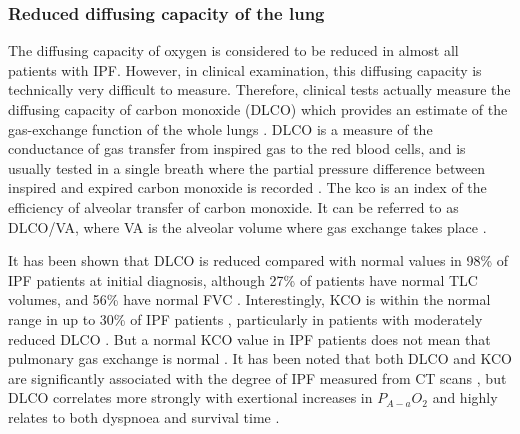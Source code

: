 \subsubsection{Reduced diffusing capacity of the lung}
The diffusing capacity of oxygen is considered to be reduced in almost all patients with IPF. However, in clinical examination, this diffusing capacity is technically very difficult to measure. Therefore, clinical tests actually measure the diffusing capacity of carbon monoxide (DLCO) which provides an estimate of the gas-exchange function of the whole lungs \citep{plantier2018physiology}. DLCO is a measure of the conductance of gas transfer from inspired gas to the red blood cells, and is usually tested in a single breath where the partial pressure difference between inspired and expired carbon monoxide is recorded \citep{rosenberg19961995,plantier2018physiology}. The \gls{kco} is an index of the efficiency of alveolar transfer of carbon monoxide. It can be referred to as DLCO/VA, where VA is the alveolar volume where gas exchange takes place \citep{graham20172017}.

It has been shown that DLCO is reduced compared with normal values in 98\% of IPF patients at initial diagnosis, although 27\% of patients have normal TLC volumes, and 56\% have normal FVC \citep{cortes2014idiopathic}. Interestingly, KCO is within the normal range in up to 30\% of IPF patients \citep{wallaert2012we}, particularly in patients with moderately reduced DLCO \citep{pastre2015different}. But a normal KCO value in IPF patients does not mean that pulmonary gas exchange is normal \citep{plantier2018physiology}. It has been noted that both DLCO and KCO are significantly associated with the degree of IPF measured from CT scans \citep{wells1997lone}, but DLCO correlates more strongly with exertional increases in $P_{A-a}O_2$ \citep{agusti1994clinical} and highly relates to both dyspnoea \citep{swigris2012ucsd} and survival time \citep{hamada2007significance}.

